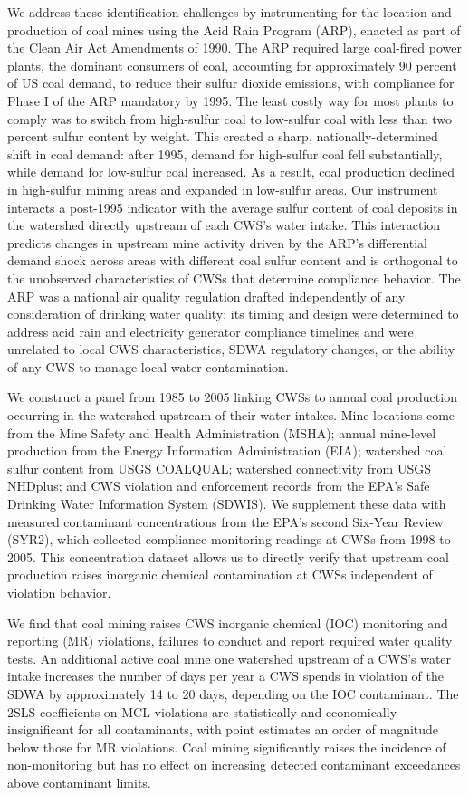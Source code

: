 \documentclass{article}
\begin{document}
We address these identification challenges by instrumenting for the location and production of coal mines using the Acid Rain Program (ARP), enacted as part of the Clean Air Act Amendments of 1990. The ARP required large coal-fired power plants, the dominant consumers of coal, accounting for approximately 90 percent of US coal demand, to reduce their sulfur dioxide emissions, with compliance for Phase I of the ARP mandatory by 1995. The least costly way for most plants to comply was to switch from high-sulfur coal to low-sulfur coal with less than two percent sulfur content by weight. This created a sharp, nationally-determined shift in coal demand: after 1995, demand for high-sulfur coal fell substantially, while demand for low-sulfur coal increased. As a result, coal production declined in high-sulfur mining areas and expanded in low-sulfur areas. Our instrument interacts a post-1995 indicator with the average sulfur content of coal deposits in the watershed directly upstream of each CWS's water intake. This interaction predicts changes in upstream mine activity driven by the ARP's differential demand shock across areas with different coal sulfur content and is orthogonal to the unobserved characteristics of CWSs that determine compliance behavior. The ARP was a national air quality regulation drafted independently of any consideration of drinking water quality; its timing and design were determined to address acid rain and electricity generator compliance timelines and were unrelated to local CWS characteristics, SDWA regulatory changes, or the ability of any CWS to manage local water contamination.

We construct a panel from 1985 to 2005 linking CWSs to annual coal production occurring in the watershed upstream of their water intakes. Mine locations come from the Mine Safety and Health Administration (MSHA); annual mine-level production from the Energy Information Administration (EIA); watershed coal sulfur content from USGS COALQUAL; watershed connectivity from USGS NHDplus; and CWS violation and enforcement records from the EPA's Safe Drinking Water Information System (SDWIS). We supplement these data with measured contaminant concentrations from the EPA's second Six-Year Review (SYR2), which collected compliance monitoring readings at CWSs from 1998 to 2005. This concentration dataset allows us to directly verify that upstream coal production raises inorganic chemical contamination at CWSs independent of violation behavior.

We find that coal mining raises CWS inorganic chemical (IOC) monitoring and reporting (MR) violations, failures to conduct and report required water quality tests. An additional active coal mine one watershed upstream of a CWS's water intake increases the number of days per year a CWS spends in violation of the SDWA by approximately 14 to 20 days, depending on the IOC contaminant. The 2SLS coefficients on MCL violations are statistically and economically insignificant for all contaminants, with point estimates an order of magnitude below those for MR violations. Coal mining significantly raises the incidence of non-monitoring but has no effect on increasing detected contaminant exceedances above contaminant limits.
\end{document}
